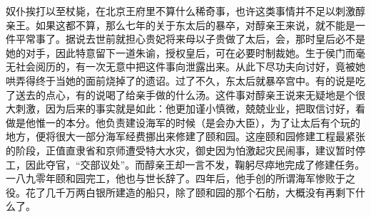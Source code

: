 奴仆挨打以至杖毙，在北京王府里不算什么稀奇事，也许这类事情并不足以刺激醇亲王。如果这都不算，那么七年的关于东太后的暴卒，对醇亲王来说，就不能是一件平常事了。据说去世前就担心贵妃将来母以子贵做了太后，会，那时皇后必不是她的对手，因此特意留下一道朱谕，授权皇后，可在必要时制裁她。生于侯门而毫无社会阅历的，有一次无意中把这件事向泄露出来。从此下尽功夫向讨好，竟被她哄弄得终于当她的面前烧掉了的遗诏。过了不久，东太后就暴卒宫中。有的说是吃了送去的点心，有的说喝了给亲手做的什么汤。这件事对醇亲王说来无疑地是个很大刺激，因为后来的事实就是如此：他更加谨小慎微，兢兢业业，把取信讨好，看做是他惟一的本分。他负责建设海军的时候（是会办大臣），为了让太后有个玩的地方，便将很大一部分海军经费挪出来修建了颐和园。这座颐和园修建工程最紧张的阶段，正值直隶省和京师遭受特大水灾，御史因为怕激起灾民闹事，建议暂时停工，因此夺官，“交部议处”。而醇亲王却一言不发，鞠躬尽瘁地完成了修建任务。一八九零年颐和园完工，他也与世长辞了。四年后，他手创的所谓海军惨败于之役。花了几千万两白银所建造的船只，除了颐和园的那个石舫，大概没有再剩下什么了。
